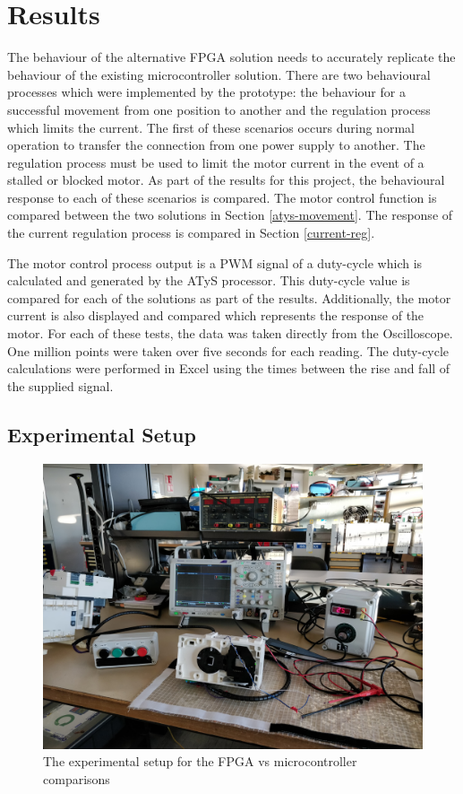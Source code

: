 \chapter{Results}
\label{results}

The behaviour of the alternative FPGA solution needs to accurately replicate the behaviour of the existing microcontroller solution. There are two behavioural processes which were implemented by the prototype: the behaviour for a successful movement from one position to another and the regulation process which limits the current. The first of these scenarios occurs during normal operation to transfer the connection from one power supply to another. The regulation process must be used to limit the motor current in the event of a stalled or blocked motor. As part of the results for this project, the behavioural response to each of these scenarios is compared. 
The motor control function is compared between the two solutions in Section \ref{atys-movement}. The response of the current regulation process is compared in Section \ref{current-reg}. 

The motor control process output is a PWM signal of a duty-cycle which is calculated and generated by the ATyS processor. This duty-cycle value is compared for each of the solutions as part of the results. Additionally, the motor current is also displayed and compared which represents the response of the motor. For each of these tests, the data was taken directly from the Oscilloscope. One million points were taken over five seconds for each reading. The duty-cycle calculations were performed in Excel using the times between the rise and fall of the supplied signal.

\section{Experimental Setup}

\begin{figure}[h]
\centering
\includegraphics[width=\textwidth]{images/AtysExperimentalSetup.jpg}
\caption{The experimental setup for the FPGA vs microcontroller comparisons}
\label{atys_experimental_setup}
\end{figure}

